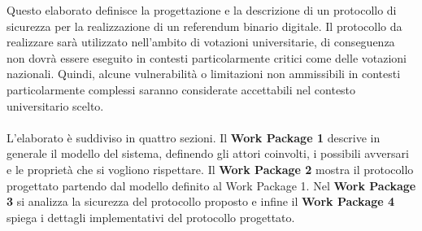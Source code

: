 Questo elaborato definisce la progettazione e la descrizione di un protocollo di sicurezza per la realizzazione di un referendum binario digitale. Il protocollo da realizzare sarà utilizzato nell'ambito di votazioni universitarie, di conseguenza non dovrà essere eseguito in contesti particolarmente critici come delle votazioni nazionali. Quindi, alcune vulnerabilità o limitazioni non ammissibili in contesti particolarmente complessi saranno considerate accettabili nel contesto universitario scelto. \\ \\
L'elaborato è suddiviso in quattro sezioni. Il \textbf{Work Package 1} descrive in generale il modello del sistema, definendo gli attori coinvolti, i possibili avversari e le proprietà che si vogliono rispettare. Il \textbf{Work Package 2} mostra il protocollo progettato partendo dal modello definito al Work Package 1. Nel \textbf{Work Package 3} si analizza la sicurezza del protocollo proposto e infine il \textbf{Work Package 4} spiega i dettagli implementativi del protocollo progettato.